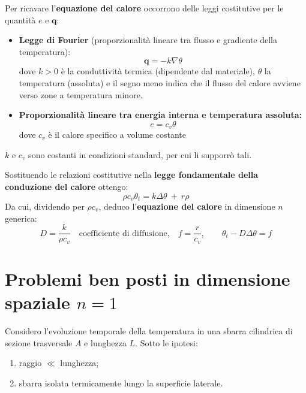 Per ricavare l'\textbf{equazione del calore} occorrono delle leggi costitutive per le quantità $e$ e $\displaystyle \mathbf{q}$:
\begin{itemize}
    \item \textbf{Legge di Fourier} (proporzionalità lineare tra flusso e gradiente della temperatura):
          \begin{equation*}
              \mathbf{q} =-k\nabla \theta
          \end{equation*}dove $k >0$ è la conduttività termica (dipendente dal materiale), $\displaystyle \theta $ la temperatura (assoluta) e il segno meno indica che il flusso del calore avviene verso zone a temperatura minore.
    \item \textbf{Proporzionalità lineare tra energia interna e temperatura assoluta:}
          \begin{equation*}
              e=c_{v} \theta
          \end{equation*}
          dove $\displaystyle c_{v}$ è il calore specifico a volume costante
\end{itemize}
$k$ e $\displaystyle c_{v}$ sono costanti in condizioni standard, per cui li supporrò tali.

Sostituendo le relazioni costitutive nella \textbf{legge fondamentale della conduzione del calore} ottengo:
\begin{equation*}
    \boxed{\rho c_{v} \theta _{t} =k\Delta \theta \ +\ r\rho }
\end{equation*}
Da cui, dividendo per $\displaystyle \rho c_{v}$, deduco l'\textbf{equazione del calore} in dimensione $n$ generica:
\begin{equation*}
    D=\frac{k}{\rho c_{v}} \quad \text{coefficiente di diffusione,} \quad f=\frac{r}{c_{v}}, \qquad \boxed{\theta _{t} -D\Delta \theta =f}
\end{equation*}

\section{Problemi ben posti in dimensione spaziale \texorpdfstring{$n=1$}{n=1}}

Considero l'evoluzione temporale della temperatura in una sbarra cilindrica di sezione trasversale $A$ e lunghezza $L$. Sotto le ipotesi:
\begin{enumerate}
    \item  raggio $\ll$ lunghezza;
    \item  sbarra isolata termicamente lungo la superficie laterale.
\end{enumerate}

